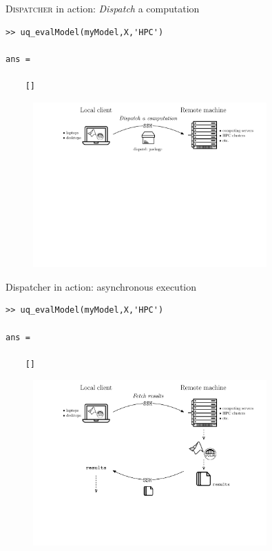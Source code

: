 \documentclass[]{rsuqbeamernew}
\begin{document}
\begin{frame}[fragile]{\textsc{Dispatcher} in action: \emph{Dispatch} a computation}

\begin{lstlisting}[basicstyle=\scriptsize,numbers=none]
>> uq_evalModel(myModel,X,'HPC')
  
ans =
  
    []
\end{lstlisting}
  
\begin{figure}[htbp]    
  \centering
  \includegraphics[width= 0.8\textwidth]{./figures/dispatch-and-fetch-dispatch.pdf}
\end{figure}

\end{frame}

\begin{frame}[fragile]{Dispatcher in action: asynchronous execution}

\begin{lstlisting}[basicstyle=\scriptsize,numbers=none]
>> uq_evalModel(myModel,X,'HPC')
    
ans =

    []
\end{lstlisting}
    
\begin{figure}[htbp]    
  \centering
  \includegraphics[width= 0.8\textwidth]{./figures/dispatch-and-fetch-fetchResults.pdf}
\end{figure}
  
\end{frame}
\end{document}
